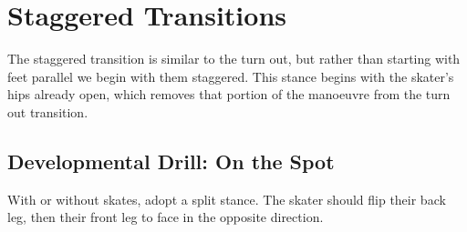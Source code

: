 \section{Staggered Transitions}
\label{sec:transitions/staggered}


The staggered transition is similar to the turn out, but rather than starting with feet parallel we begin with them staggered.  
This stance begins with the skater's hips already open, which removes that portion of the manoeuvre from the turn out transition.  

\subsection*{Developmental Drill: On the Spot} 

With or without skates, adopt a split stance. 
The skater should flip their back leg, then their front leg to face in the opposite direction.  
